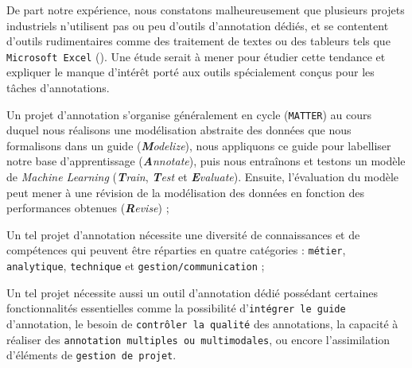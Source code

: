 		\begin{leftBarAuthorOpinion}
			De part notre expérience, nous constatons malheureusement que plusieurs projets industriels n'utilisent pas ou peu d'outils d'annotation dédiés, et se contentent d'outils rudimentaires comme des traitement de textes ou des tableurs tels que \texttt{Microsoft Excel} (\cite{microsoft-corporation:2018:microsoft-excel}).
			Une étude serait à mener pour étudier cette tendance et expliquer le manque d'intérêt porté aux outils spécialement conçus pour les tâches d'annotations.
		\end{leftBarAuthorOpinion}
	
	\begin{leftBarSummary}
		\begin{todolist}
			\item[\itemok] Un projet d'annotation s'organise généralement en cycle (\texttt{MATTER}) au cours duquel nous réalisons une modélisation abstraite des données que nous formalisons dans un guide (\textit{\textbf{M}odelize}), nous appliquons ce guide pour labelliser notre base d'apprentissage (\textit{\textbf{A}nnotate}), puis nous entraînons et testons un modèle de \textit{Machine Learning} (\textit{\textbf{T}rain}, \textit{\textbf{T}est} et \textit{\textbf{E}valuate}). Ensuite, l'évaluation du modèle peut mener à une révision de la modélisation des données en fonction des performances obtenues (\textit{\textbf{R}evise}) ;
			\item[\itemok] Un tel projet d'annotation nécessite une diversité de connaissances et de compétences qui peuvent être réparties en quatre catégories : \texttt{métier}, \texttt{analytique}, \texttt{technique} et \texttt{gestion/communication} ;
			\item[\itemok] Un tel projet nécessite aussi un outil d'annotation dédié possédant certaines fonctionnalités essentielles comme la possibilité d'\texttt{intégrer le guide} d'annotation, le besoin de \texttt{contrôler la qualité} des annotations, la capacité à réaliser des \texttt{annotation multiples ou multimodales}, ou encore l'assimilation d'éléments de \texttt{gestion de projet}.
		\end{todolist}
	\end{leftBarSummary}